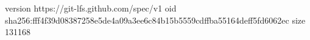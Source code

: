version https://git-lfs.github.com/spec/v1
oid sha256:fff4f39d08387258e5de4a09a3ee6c84b15b5559cdffba55164deff5fd6062ec
size 131168
